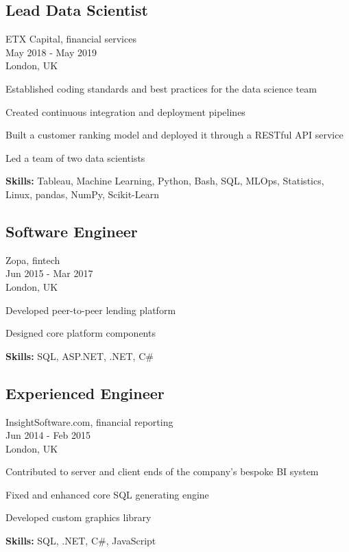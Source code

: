 \documentclass[a4paper,10pt]{article}
\begin{document}
\subsection*{Lead Data Scientist}
ETX Capital, financial services \\
May 2018 - May 2019 \\
London, UK
\begin{bulletlist}
    \item Established coding standards and best practices for the data science team
    \item Created continuous integration and deployment pipelines
    \item Built a customer ranking model and deployed it through a RESTful API service
    \item Led a team of two data scientists
\end{bulletlist}
\textbf{Skills: }Tableau, Machine Learning, Python, Bash, SQL, MLOps, Statistics, Linux, pandas, NumPy, Scikit-Learn

\subsection*{Software Engineer}
Zopa, fintech \\
Jun 2015 - Mar 2017 \\
London, UK
\begin{bulletlist}
    \item Developed peer-to-peer lending platform
    \item Designed core platform components
\end{bulletlist}
\textbf{Skills:} SQL, ASP.NET, .NET, C\#

\subsection*{Experienced Engineer}
InsightSoftware.com, financial reporting \\
Jun 2014 - Feb 2015 \\
London, UK
\begin{bulletlist}
    \item Contributed to server and client ends of the company's bespoke BI system
    \item Fixed and enhanced core SQL generating engine
    \item Developed custom graphics library
\end{bulletlist}
\textbf{Skills:} SQL, .NET, C\#, JavaScript
\end{document}

